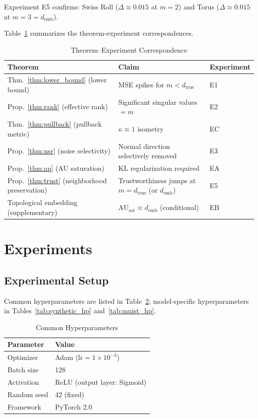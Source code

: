 \documentclass[lettersize,journal]{IEEEtran}
\newcommand{\dtrue}{d_{\mathrm{true}}}
\newcommand{\kap}{\kappa}
\newcommand{\AUsat}{\mathrm{AU}_{\mathrm{sat}}}
\newcommand{\demb}{d_{\mathrm{emb}}}
\begin{document}
Experiment E5 confirms: Swiss Roll ($\Delta \approx 0.015$ at $m=2$) and Torus ($\Delta \approx 0.015$ at $m=3=\demb$).

Table~\ref{tab:theorem_exp} summarizes the theorem-experiment correspondences.

\begin{table}[!t]
\centering
\caption{Theorem--Experiment Correspondence}
\label{tab:theorem_exp}
\begin{tabular}{l p{7cm} l}
\toprule
Theorem & Claim & Experiment \\
\midrule
Thm.~\ref{thm:lower_bound} (lower bound) & MSE spikes for $m < \dtrue$ & E1 \\
Prop.~\ref{thm:rank} (effective rank) & Significant singular values $= m$ & E2 \\
Thm.~\ref{thm:pullback} (pullback metric) & $\kap \approx 1$ isometry & EC \\
Prop.~\ref{thm:nsr} (noise selectivity) & Normal direction selectively removed & E3 \\
Prop.~\ref{thm:au} (AU saturation) & KL regularization required & EA \\
Prop.~\ref{thm:trust} (neighborhood preservation) & Trustworthiness jumps at $m = \dtrue$ (or $\demb$) & E5 \\
Topological embedding (supplementary) & $\AUsat \approx \demb$ (conditional) & EB \\
\bottomrule
\end{tabular}
\end{table}

\section{Experiments}\label{sec:exp}

\subsection{Experimental Setup}\label{sec:exp_setup}

Common hyperparameters are listed in Table~\ref{tab:common_hp}; model-specific hyperparameters in Tables~\ref{tab:synthetic_hp} and~\ref{tab:mnist_hp}.

\begin{table}[!t]
\centering
\caption{Common Hyperparameters}
\label{tab:common_hp}
\begin{tabular}{ll}
\toprule
Parameter & Value \\
\midrule
Optimizer & Adam ($\mathrm{lr} = 1\times10^{-3}$) \\
Batch size & 128 \\
Activation & ReLU (output layer: Sigmoid) \\
Random seed & 42 (fixed) \\
Framework & PyTorch 2.0 \\
\bottomrule
\end{tabular}
\end{table}
\end{document}
